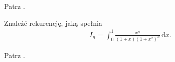 
\begin{solution}
    Patrz \cite[s. 17]{valean19}.
\end{solution}

\begin{problem_with_solution}
    \label{valean_1_32}%
    Znaleźć rekurencję, jaką spełnia
    \begin{align}
        I_n = \int_0^1 \frac{x^n}{(1+x)(1+x^2)^n} \,\mathrm{d}x.
    \end{align} 
\end{problem_with_solution}


\begin{solution}
    Patrz \cite[s. 21, 22]{valean19}.
\end{solution}


%